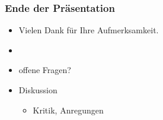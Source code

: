 \documentclass[
    t,
    smaller,
    compress,
]{beamer}
\begin{document}
\begin{frame}
    \frametitle{Ende der Präsentation}
    \LARGE
    \begin{itemize}[<1->]
        \item Vielen Dank für Ihre Aufmerksamkeit.
        \item
        \item offene Fragen?
        \item Diskussion
        \begin{itemize}[<1->]
          \Large
          \item Kritik, Anregungen
        \end{itemize}
    \end{itemize}
\end{frame}
\end{document}
